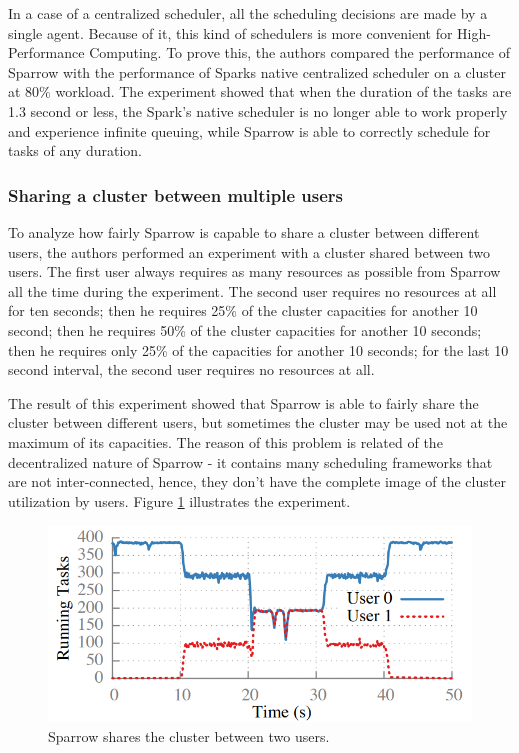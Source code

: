 \documentclass[11pt]{article}
\begin{document}
        	In a case of a centralized scheduler, all the scheduling decisions are made by a single agent. Because of it, this kind of schedulers is more convenient for High-Performance Computing. To prove this, the authors compared the performance of Sparrow with the performance of Sparks native centralized scheduler on a cluster at 80\% workload. The experiment showed that when the duration of the tasks are 1.3 second or less, the Spark's native scheduler is no longer able to work properly and experience infinite queuing, while Sparrow is able to correctly schedule for tasks of any duration.
        
        
        \subsubsection*{Sharing a cluster between multiple users}
        
        	To analyze how fairly Sparrow is capable to share a cluster between different users, the authors performed an experiment with a cluster shared between two users. The first user always requires as many resources as possible from Sparrow all the time during the experiment. The second user requires no resources at all for ten seconds; then he requires 25\% of the cluster capacities for another 10 second; then he requires 50\% of the cluster capacities for another 10 seconds; then he requires only 25\% of the capacities for another 10 seconds; for the last 10 second interval, the second user requires no resources at all.
            
            The result of this experiment showed that Sparrow is able to fairly share the cluster between different users, but sometimes the cluster may be used not at the maximum of its capacities. The reason of this problem is related of the decentralized nature of Sparrow - it contains many scheduling frameworks that are not inter-connected, hence, they don't have the complete image of the cluster utilization by users. Figure \ref{fig5} illustrates the experiment.
            
            \begin{figure}
            		\includegraphics[scale=.5]{fig5}
            		\caption{Sparrow shares the cluster between two users.}
            		\label{fig5}
            \end{figure}
        
\end{document}
